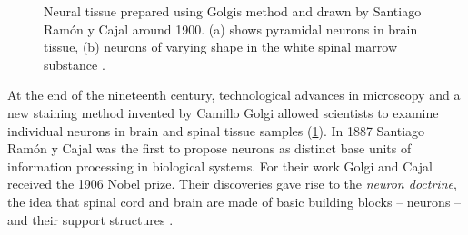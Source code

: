 \begin{figure}
	\small
	\centering
	\hspace*{0.75cm}
	\caption[Drawings by Santiago Ramón y Cajal]{Neural tissue prepared using Golgis method and drawn by Santiago Ramón y Cajal around 1900. (a) shows pyramidal neurons in brain tissue, (b) neurons of varying shape in the white spinal marrow substance \cite{ramon1904textura}.}
	\label{fig:cajal}
\end{figure}
At the end of the nineteenth century, technological advances in microscopy and a new staining method invented by Camillo Golgi allowed scientists to examine individual neurons in brain and spinal tissue samples (\cref{fig:cajal}). In 1887 Santiago Ramón y Cajal was the first to propose neurons as distinct base units of information processing in biological systems. For their work Golgi and Cajal received the 1906 Nobel prize. Their discoveries gave rise to the \emph{neuron doctrine}, the idea that spinal cord and brain are made of basic building blocks -- neurons -- and their support structures \cite{glickstein2006golgi}.

